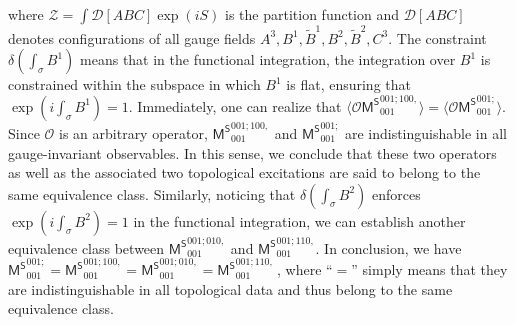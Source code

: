 \documentclass[11pt,nofootinbib,preprint]{revtex4-1}
\begin{document}
where $\mathcal{Z} =\int\mathcal{D} \left[ABC\right] \exp \left( iS \right) $ is the partition function and $\mathcal{D}[ABC]$ denotes configurations of all gauge fields $A^3,B^1,\tilde{B}^1,B^2,\tilde{B}^2,C^3$. The constraint $\delta \left( \int_{\sigma}{B^1} \right) $ means that in the functional integration, the integration over $B^1$ is constrained within the subspace in which $B^1$ is flat, ensuring that $\exp \left( i\int_{\sigma}{{B}^1} \right)=1 $. Immediately, one can realize that $\langle \mathcal{O} \mathsf{M^S}_{001}^{001;100,} \rangle=\langle \mathcal{O} \mathsf{M^S}_{001}^{001;} \rangle$. 
Since $\mathcal{O}$ is an arbitrary operator, $\mathsf{M^S}_{001}^{001;100,}$ and $\mathsf{M^S}_{001}^{001;}$ are indistinguishable in all gauge-invariant observables. In this sense, we conclude that these two operators as well as the associated two topological excitations  are said to  belong to the same equivalence class. Similarly, noticing that $\delta \left( \int_{\sigma}{{B}^2} \right) $ enforces $\exp \left( i\int_{\sigma}{{B}^2} \right)=1$ in the functional integration, we can establish another equivalence class between  $\mathsf{M^S}_{001}^{001;010,}$ and $\mathsf{M^S}_{001}^{001;110,}$. In conclusion, we have
$	\mathsf{M^S}_{001}^{001;}=\mathsf{M^S}_{001}^{001;100,}=\mathsf{M^S}_{001}^{001;010,}=\mathsf{M^S}_{001}^{001;110,}\,$,
where ``$=$'' simply means that they are indistinguishable in all topological data and thus belong to the same equivalence class. 
\end{document}

